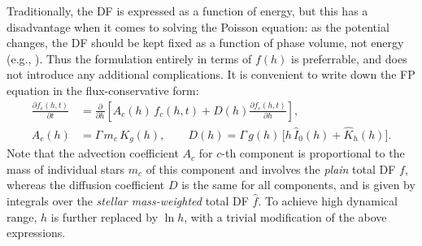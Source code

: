 \documentclass[12pt]{article}
\newcommand{\D}{\partial}
\begin{document}
Traditionally, the DF is expressed as a function of energy, but this has a disadvantage when it comes to solving the Poisson equation: as the potential changes, the DF should be kept fixed as a function of phase volume, not energy (e.g., \cite{Cohn1980}). Thus the formulation entirely in terms of $f(h)$ is preferrable, and does not introduce any additional complications. It is convenient to write down the FP equation in the flux-conservative form:
\begin{align}
\frac{\D f_c(h,t)}{\D t} &= 
\frac{\D }{\D h} \left[ A_c(h)\,f_c(h,t) + D(h) \frac{\D f_c(h,t)}{\D h} \right] ,
\label{eq:FokkerPlanck} \\
A_c(h) &= \Gamma\, m_c\, K_g(h), \qquad
D(h)    = \Gamma\, g(h)\, \big[ h\, \widehat I_0(h) + \widehat K_h(h) \big].
\label{eq:FokkerPlanckCoefs}
\end{align}
Note that the advection coefficient $A_c$ for $c$-th component is proportional to the mass of individual stars $m_c$ of this component and involves the \textsl{plain} total DF $f$, whereas the diffusion coefficient $D$ is the same for all components, and is given by integrals over the \textsl{stellar mass-weighted} total DF $\widehat f$.
To achieve high dynamical range, $h$ is further replaced by $\ln h$, with a trivial modification of the above expressions.
\end{document}
